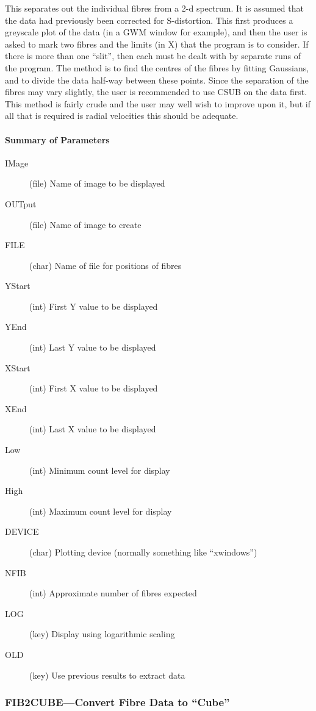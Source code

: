 \documentclass[11pt,twoside]{article}
\newcommand{\xlabel}[1]{}
\begin{document}
This separates out the individual fibres from a 2-d spectrum. It is
assumed that the data had previously been corrected for S-distortion.
This first produces a greyscale plot of the data (in a GWM window for
example), and then the user is asked to mark two fibres and the limits
(in X) that the program is to consider.
If there is more than one ``slit'', then each must be dealt with by
separate runs of the program.
The method is to find the centres of the fibres by fitting Gaussians,
and to divide the data half-way between these points. Since the
separation of the fibres may vary slightly, the user is recommended
to use CSUB on the data first. This method is fairly crude and the user
may well wish to improve upon it, but if all that is required is radial
velocities this should be adequate.

\paragraph{Summary of Parameters}

\begin{description}
\item[IMage] (file) Name of image to be displayed
\item[OUTput] (file) Name of image to create
\item[FILE] (char) Name of file for positions of fibres
\item[YStart] (int) First Y value to be displayed
\item[YEnd] (int) Last Y value to be displayed
\item[XStart] (int) First X value to be displayed
\item[XEnd] (int) Last X value to be displayed
\item[Low] (int) Minimum count level for display
\item[High] (int) Maximum count level for display
\item[DEVICE] (char) Plotting device (normally something like ``xwindows'')
\item[NFIB] (int) Approximate number of fibres expected
\item[LOG] (key) Display using logarithmic scaling
\item[OLD] (key) Use previous results to extract data
\end{description}

\subsubsection{\xlabel{fib2cubeconvert_fibre_data_to_cube}FIB2CUBE---Convert Fibre Data to ``Cube''}
\end{document}
